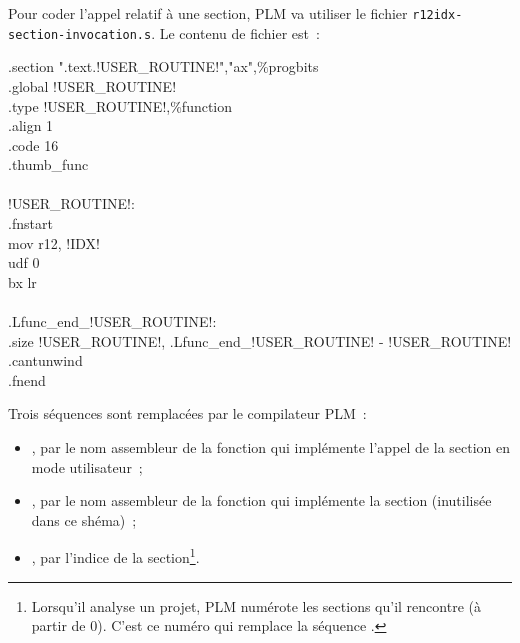 Pour coder l'appel relatif à une section, PLM va utiliser le fichier \texttt{r12idx-section-invocation.s}. Le contenu de fichier est~:
\begin{SHELL}\small
\hspace*{1.2em}.section  ".text.!USER\_ROUTINE!","ax",\%progbits\\
\hspace*{1.2em}.global !USER\_ROUTINE!\\
\hspace*{1.2em}.type  !USER\_ROUTINE!,\%function\\
\hspace*{1.2em}.align  1\\
\hspace*{1.2em}.code  16\\
\hspace*{1.2em}.thumb\_func\\
\\
!USER\_ROUTINE!:\\
\hspace*{1.2em}.fnstart\\
\hspace*{1.2em}mov r12, !IDX!\\
\hspace*{1.2em}udf 0\\
\hspace*{1.2em}bx  lr\\
\\
.Lfunc\_end\_!USER\_ROUTINE!:\\
\hspace*{1.2em}.size  !USER\_ROUTINE!, .Lfunc\_end\_!USER\_ROUTINE! - !USER\_ROUTINE!\\
\hspace*{1.2em}.cantunwind\\
\hspace*{1.2em}.fnend
\end{SHELL}

Trois séquences sont remplacées par le compilateur PLM~:
\begin{itemize}
\item {}, par le nom assembleur de la fonction qui implémente l'appel de la section en mode utilisateur~;
\item {}, par le nom assembleur de la fonction qui implémente la section (inutilisée dans ce shéma)~;
\item {}, par l'indice de la section\footnote{Lorsqu'il analyse un projet, PLM numérote les sections qu'il rencontre (à partir de $0$). C'est ce numéro qui remplace la séquence .}.
\end{itemize}

